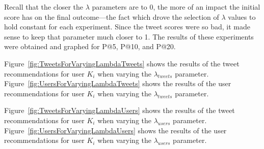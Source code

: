 Recall that the closer the $\lambda$ parameters are to 0, the more of an impact the initial score has on the final outcome---the fact which drove the selection of $\lambda$ values to hold constant for each experiment. Since the tweet scores were so bad, it made sense to keep that parameter much closer to 1. The results of these experiments were obtained and graphed for P@5, P@10, and P@20.

Figure~\ref{fig:TweetsForVaryingLambdaTweets} shows the results of the tweet recommendations for user $K_{i}$ when varying the $\lambda_{tweets}$ parameter. Figure~\ref{fig:UsersForVaryingLambdaTweets} shows the results of the user recommendations for user $K_{i}$ when varying the $\lambda_{tweets}$ parameter. %

Figure~\ref{fig:TweetsForVaryingLambdaUsers} shows the results of the tweet recommendations for user $K_{i}$ when varying the $\lambda_{users}$ parameter. Figure~\ref{fig:UsersForVaryingLambdaUsers} shows the results of the user recommendations for user $K_{i}$ when varying the $\lambda_{users}$ parameter. %









